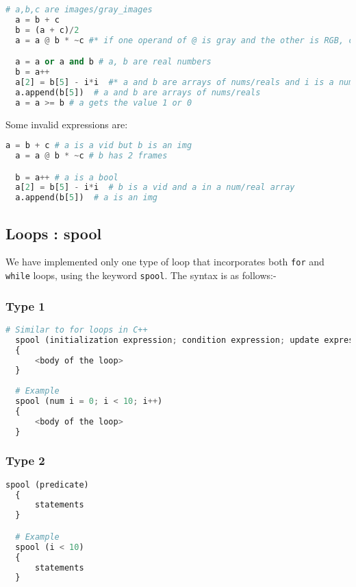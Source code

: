 \documentclass[a4paper, 11pt]{article}
\begin{document}
    \begin{lstlisting}[language=Python]
  # a,b,c are images/gray_images
  a = b + c
  b = (a + c)/2
  a = a @ b * ~c #* if one operand of @ is gray and the other is RGB, casting to RGB takes place *#

  a = a or a and b # a, b are real numbers
  b = a++
  a[2] = b[5] - i*i  #* a and b are arrays of nums/reals and i is a num/real. This also works with videos *#
  a.append(b[5])  # a and b are arrays of nums/reals
  a = a >= b # a gets the value 1 or 0\end{lstlisting}

    Some invalid expressions are:

  \begin{lstlisting}[language=Python]
  a = b + c # a is a vid but b is an img
  a = a @ b * ~c # b has 2 frames

  b = a++ # a is a bool
  a[2] = b[5] - i*i  # b is a vid and a in a num/real array
  a.append(b[5])  # a is an img\end{lstlisting}
  
    \subsection{Loops : spool}

    We have implemented only one type of loop that incorporates both \texttt{for} and \texttt{while} loops, using the keyword \texttt{spool}. The syntax is as follows:-
    \subsubsection*{Type 1}

    
      \begin{lstlisting}[language=Python]
  # Similar to for loops in C++
  spool (initialization expression; condition expression; update expression)
  {
      <body of the loop>
  }
  
  # Example
  spool (num i = 0; i < 10; i++)
  {
      <body of the loop>
  }\end{lstlisting}

      \subsubsection*{Type 2}

      
      \begin{lstlisting}[language=Python]
  spool (predicate) 
  {
      statements
  }

  # Example
  spool (i < 10)
  {
      statements
  }\end{lstlisting}  
\end{document}
